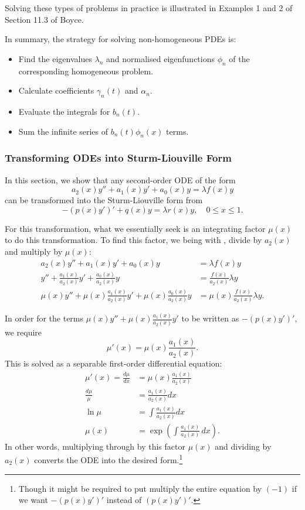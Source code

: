 Solving these types of problems in practice is illustrated in Examples 1 and 2 of Section 11.3 of Boyce.

In summary, the strategy for solving non-homogeneous PDEs is:
\begin{itemize}
	\item Find the eigenvalues $\lambda_n$ and normalised eigenfunctions $\phi_n$ of the corresponding homogeneous problem.
	\item Calculate coefficients $\gamma_n(t)$ and $\alpha_n$.
	\item Evaluate the integrals for $b_n(t)$.
	\item Sum the infinite series of $b_n(t) \phi_n(x)$ terms.
\end{itemize}


\subsubsection{Transforming ODEs into Sturm-Liouville Form}

In this section, we show that any second-order ODE of the form
\begin{equation}\label{eq:sltransform}
	a_2(x)y'' + a_1(x)y' + a_0(x)y = \lambda f(x)y
\end{equation}
can be transformed into the Sturm-Liouville form from 
\begin{equation}\label{eq:sltransform2}
	-\left(p(x)y'\right)' + q(x)y = \lambda r(x)y, \quad 0 \leq x \leq 1.
\end{equation}

For this transformation, what we essentially seek is an integrating factor $\mu(x)$ to do this transformation. To find this factor, we being with , divide by $a_2(x)$ and multiply by $\mu(x)$:
\begin{align*}
	a_2(x)y'' + a_1(x)y' + a_0(x)y &= \lambda f(x)y \\
	y'' + \frac{a_1(x)}{a_2(x)}y' + \frac{a_0(x)}{a_2(x)}y &= \frac{f(x)}{a_2(x)}\lambda y \\
	\mu(x)y'' + \mu(x)\frac{a_1(x)}{a_2(x)}y' + \mu(x)\frac{a_0(x)}{a_2(x)}y &= \mu(x)\frac{f(x)}{a_2(x)}\lambda y.
\end{align*}

In order for the terms $\mu(x)y'' + \mu(x)\frac{a_1(x)}{a_2(x)}y'$ to be written as $-(p(x)y')'$, we require
\[
\mu'(x) = \mu(x)\frac{a_1(x)}{a_2(x)}.
\]
This is solved as a separable first-order differential equation:
\begin{align*}
	\mu'(x) = \frac{d\mu}{dx} &= \mu(x)\frac{a_1(x)}{a_2(x)} \\
	\frac{d\mu}{\mu} &= \frac{a_1(x)}{a_2(x)} dx \\ \ln\mu &= \int \frac{a_1(x)}{a_2(x)} dx \\
	\mu(x) &= \exp\left(\int \frac{a_1(x)}{a_2(x)} \,dx\right).
\end{align*}
In other words, multiplying through by this factor $\mu(x)$ and dividing by $a_2(x)$ converts the ODE into the desired form.\footnote{Though it might be required to put multiply the entire equation by $(-1)$ if we want $-(p(x)y')'$ instead of $(p(x)y')'$.}

